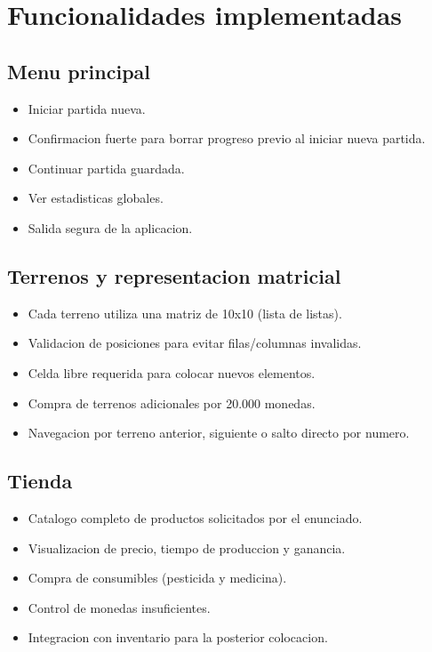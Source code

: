 \documentclass[12pt,a4paper]{article}
\begin{document}
\section{Funcionalidades implementadas}
\subsection{Menu principal}
\begin{itemize}
    \item Iniciar partida nueva.
    \item Confirmacion fuerte para borrar progreso previo al iniciar nueva partida.
    \item Continuar partida guardada.
    \item Ver estadisticas globales.
    \item Salida segura de la aplicacion.
\end{itemize}

\subsection{Terrenos y representacion matricial}
\begin{itemize}
    \item Cada terreno utiliza una matriz de 10x10 (lista de listas).
    \item Validacion de posiciones para evitar filas/columnas invalidas.
    \item Celda libre requerida para colocar nuevos elementos.
    \item Compra de terrenos adicionales por 20.000 monedas.
    \item Navegacion por terreno anterior, siguiente o salto directo por numero.
\end{itemize}

\subsection{Tienda}
\begin{itemize}
    \item Catalogo completo de productos solicitados por el enunciado.
    \item Visualizacion de precio, tiempo de produccion y ganancia.
    \item Compra de consumibles (pesticida y medicina).
    \item Control de monedas insuficientes.
    \item Integracion con inventario para la posterior colocacion.
\end{itemize}
\end{document}
